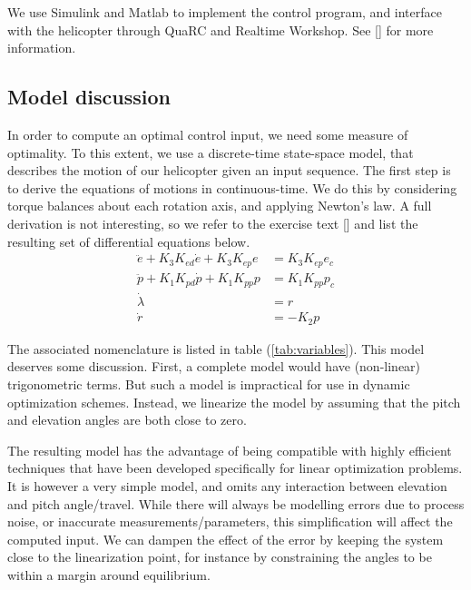 We use Simulink and Matlab to implement the control program, and interface with the helicopter through QuaRC and Realtime Workshop. See [\cite{LabExercise}] for more information.

\subsection{Model discussion}
In order to compute an optimal control input, we need some measure of optimality.
To this extent, we use a discrete-time state-space model, that describes the motion
of our helicopter given an input sequence. The first step is to derive the equations
of motions in continuous-time. We do this by considering torque balances about each
rotation axis, and applying Newton's law. A full derivation is not interesting, so
we refer to the exercise text [\cite{LabExercise}] and list the resulting set of
differential equations below.
\begin{subequations}
\label{eq:model_al}
\begin{align}
    \ddot{e} + K_{3} K_{ed} \dot{e} + K_{3} K_{ep} e &= K_{3} K_{ep} e_{c} \label{eq:model_se_al_elev} \\
    \ddot{p} + K_{1} K_{pd} \dot{p} + K_{1} K_{pp} p &= K_{1} K_{pp} p_{c} \label{eq:model_se_al_pitch} \\
    \dot{\lambda} &= r \label{eq:model_se_al_lambda} \\
    \dot{r} &= -K_{2} p \label{eq:model_se_al_r}
\end{align}
\end{subequations}

The associated nomenclature is listed in table (\ref{tab:variables}). This model deserves some discussion. First, a complete model would have (non-linear) trigonometric terms. But such a model is impractical for use in dynamic optimization schemes. Instead, we linearize the model by assuming that the pitch and elevation angles are both close to zero.

The resulting model has the advantage of being compatible with highly efficient techniques that have been developed specifically for linear optimization problems. It is however a very simple model, and omits any interaction between elevation and pitch angle/travel. While there will always be modelling errors due to process noise, or inaccurate measurements/parameters, this simplification will affect the computed input. We can dampen the effect of the error by keeping the system close to the linearization point, for instance by constraining the angles to be within a margin around equilibrium.

